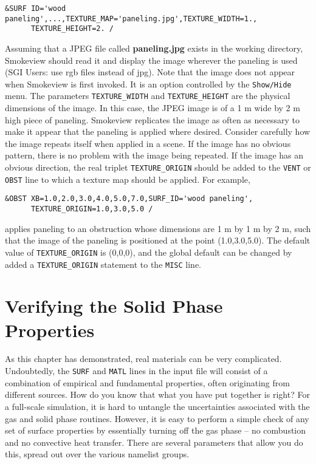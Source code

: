 \documentclass[11pt]{book}
\newcommand{\ct}{\tt\small}
\begin{document}
\footnotesize
\begin{verbatim}
&SURF ID='wood paneling',...,TEXTURE_MAP='paneling.jpg',TEXTURE_WIDTH=1.,
      TEXTURE_HEIGHT=2. /
\end{verbatim}
\normalsize
Assuming that a JPEG file called {\bf paneling.jpg} exists in the
working directory, Smokeview should read it and display the image
wherever the paneling is used (SGI Users: use rgb files instead of jpg).
Note that the image does not appear when Smokeview is first invoked. It is an option controlled by
the {\ct Show/Hide} menu. The parameters {\ct TEXTURE\_WIDTH}
and {\ct TEXTURE\_HEIGHT} are the physical dimensions of the image.
In this case, the JPEG image is of a 1 m wide by 2 m high piece of
paneling. Smokeview replicates the image as often as necessary to
make it appear that the paneling is applied where desired.
Consider carefully how the image repeats itself when
applied in a scene. If the image has no obvious pattern, there is no
problem with the image being repeated. If the image has an obvious
direction, the real triplet {\ct TEXTURE\_ORIGIN} should be added to
the {\ct VENT} or {\ct OBST} line to which a texture map
should be applied. For example,

\footnotesize
\begin{verbatim}
&OBST XB=1.0,2.0,3.0,4.0,5.0,7.0,SURF_ID='wood paneling',
      TEXTURE_ORIGIN=1.0,3.0,5.0 /
\end{verbatim}
\normalsize
applies paneling to an obstruction whose dimensions are 1 m by
1 m by 2 m, such that the image of the paneling is positioned
at the point (1.0,3.0,5.0). The default value of {\ct TEXTURE\_ORIGIN}
is (0,0,0), and the global default can be changed by added a
{\ct TEXTURE\_ORIGIN} statement to the {\ct MISC} line.




\clearpage

\section{Verifying the Solid Phase Properties}
\label{solid_phase_verification}

As this chapter has demonstrated, real materials can be very complicated. Undoubtedly, the {\ct SURF} and {\ct MATL} lines in the
input file will consist of a combination of empirical and fundamental properties, often originating from different sources. How do you know
that what you have put together is right? For a full-scale simulation, it is hard to untangle the uncertainties associated with the gas and solid
phase routines. However, it is easy to perform a simple check of any set of surface properties by essentially turning off the gas phase -- no combustion and
no convective heat transfer. There are several parameters that allow you do this, spread out over the various namelist groups.
\end{document}
